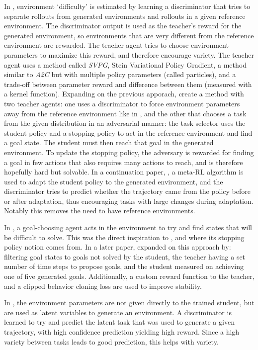\documentclass[letterpaper]{article}
\theoremstyle{definition}
\begin{document}
In \cite{Mehta2019}, environment `difficulty' is estimated by learning a discriminator that tries to separate rollouts from generated environments and rollouts in a given reference environment. The discriminator output is used as the teacher's reward for the generated environment, so environments that are very different from the reference environment are rewarded. 
The teacher agent tries to choose environment parameters to maximize this reward, and therefore encourage variety. The teacher agent uses a method called \textit{SVPG}, Stein Variational Policy Gradient, a method similar to \textit{A2C} but with multiple policy parameters (called particles), and a trade-off between parameter reward and difference between them (measured with a kernel function).
Expanding on the previous apporach, \cite{Raparthy2020} create a method with two teacher agents: one uses a discriminator to force environment parameters away from the reference environment like in \cite{Mehta2019}, and the other that chooses a task from the given distribution in an adversarial manner: the task selector uses the student policy and a stopping policy to act in the reference environment and find a goal state. The student must then reach that goal in the generated environment. To update the stopping policy, the adversary is rewarded for finding a goal in few actions that also requires many actions to reach, and is therefore hopefully hard but solvable. 
In a continuation paper, \cite{Mehta2020}, a meta-RL algorithm is used to adapt the student policy to the generated environment, and the discriminator tries to predict whether the trajectory came from the policy before or after adaptation, thus encouraging tasks with large changes during adaptation. Notably this removes the need to have reference environments.

In \cite{Sukhbaatar2017}, a goal-choosing agent acts in the environment to try and find states that will be difficult to solve. This was the direct inspiration to \cite{Raparthy2020}, and where its stopping policy notion comes from. In a later paper, \cite{OpenAI2021} expanded on this approach by: filtering goal states to goals not solved by the student, the teacher having a set number of time steps to propose goals, and the student measured on achieving one of five generated goals. Additionally, a custom reward function to the teacher, and a clipped behavior cloning loss are used to improve stability.

In \cite{Gupta2018}, the environment parameters are not given directly to the trained student, but are used as latent variables to generate an environment. A discriminator is learned to try and predict the latent task that was used to generate a given trajectory, with high confidence prediction yielding high reward. Since a high variety between tasks leads to good prediction, this helps with variety.
\end{document}
